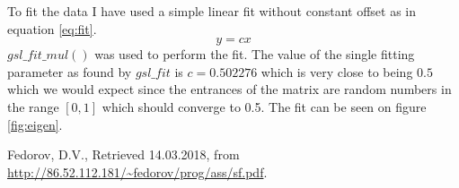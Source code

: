 \documentclass{report}
\begin{document}
To fit the data I have used a simple linear fit without constant offset as in equation \eqref{eq:fit}. 
\begin{equation}
y = cx
\label{eq:fit}
\end{equation}
$gsl\_fit\_mul()$ was used to perform the fit. The value of the single fitting parameter as found by $gsl\_fit$ is $c=0.502276$ which is very close to being $0.5$ which we would expect since the entrances of the matrix are random numbers in the range $[0,1]$ which should converge to 0.5. The fit can be seen on figure \ref{fig:eigen}.  




\bgroup
\let\clearpage\relax
\begin{thebibliography}{9}

Fedorov, D.V., 
Retrieved 14.03.2018, 
from \url{http://86.52.112.181/~fedorov/prog/ass/sf.pdf}.

\end{thebibliography}
\egroup
\end{document}
